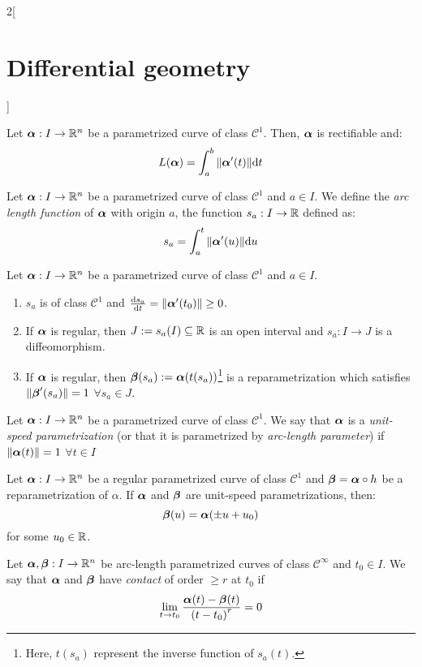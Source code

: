 \documentclass[../../../main.tex]{subfiles}
\begin{document}
\begin{multicols}{2}[\section{Differential geometry}]
\begin{definition}
  \end{definition}
  \begin{prop}
    Let $\boldsymbol{\mathrm{\alpha}}:I\rightarrow\mathbb{R}^n$ be a parametrized curve of class $\mathcal{C}^1$. Then, $\boldsymbol{\mathrm{\alpha}}$ is rectifiable and: $$L(\boldsymbol{\mathrm{\alpha}})=\int_a^b\|\boldsymbol{\mathrm{\alpha}}'(t)\|\dd t$$
  \end{prop}
  \begin{definition}
    Let $\boldsymbol{\mathrm{\alpha}}:I\rightarrow\mathbb{R}^n$ be a parametrized curve of class $\mathcal{C}^1$ and $a\in I$. We define the \emph{arc length function} of $\boldsymbol{\mathrm{\alpha}}$ with origin $a$, the function $s_a:I\rightarrow\mathbb{R}$ defined as: $$s_a=\int_a^t\|\boldsymbol{\mathrm{\alpha}}'(u)\|\dd u$$
  \end{definition}
  \begin{prop}
    Let $\boldsymbol{\mathrm{\alpha}}:I\rightarrow\mathbb{R}^n$ be a parametrized curve of class $\mathcal{C}^1$ and $a\in I$.
    \begin{enumerate}
      \item $s_a$ is of class $\mathcal{C}^1$ and $\dv{s_a}{t}(t_0)=\|\boldsymbol{\mathrm{\alpha}}'(t_0)\|\geq 0$.
      \item If $\boldsymbol{\mathrm{\alpha}}$ is regular, then $J:=s_a(I)\subseteq\mathbb{R}$ is an open interval and $s_a:I\rightarrow J$ is a diffeomorphism.
      \item If $\boldsymbol{\mathrm{\alpha}}$ is regular, then $\boldsymbol{\mathrm{\beta}}(s_a):=\boldsymbol{\mathrm{\alpha}}(t(s_a))$\footnote{Here, $t(s_a)$ represent the inverse function of $s_a(t)$.} is a reparametrization which satisfies $\|\boldsymbol{\mathrm{\beta}}'(s_a)\|=1$ $\forall s_a\in J$.
    \end{enumerate}
  \end{prop}
  \begin{definition}
    Let $\boldsymbol{\mathrm{\alpha}}:I\rightarrow\mathbb{R}^n$ be a parametrized curve of class $\mathcal{C}^1$. We say that $\boldsymbol{\mathrm{\alpha}}$ is a \emph{unit-speed parametrization} (or that it is parametrized by \emph{arc-length parameter}) if $\|\boldsymbol{\mathrm{\alpha}}(t)\|=1$ $\forall t\in I$
  \end{definition}
  \begin{prop}
    Let $\boldsymbol{\mathrm{\alpha}}:I\rightarrow\mathbb{R}^n$ be a regular parametrized curve of class $\mathcal{C}^1$ and $\boldsymbol{\mathrm{\beta}}=\boldsymbol{\mathrm{\alpha}}\circ h$ be a reparametrization of $\alpha$. If $\boldsymbol{\mathrm{\alpha}}$ and $\boldsymbol{\mathrm{\beta}}$ are unit-speed parametrizations, then: $$\boldsymbol{\mathrm{\beta}}(u)=\boldsymbol{\mathrm{\alpha}}(\pm u+u_0)$$ for some $u_0\in\mathbb{R}$.
  \end{prop}
  \begin{definition}
    Let $\boldsymbol{\mathrm{\alpha}},\boldsymbol{\mathrm{\beta}}:I\rightarrow\mathbb{R}^n$ be arc-length parametrized curves of class $\mathcal{C}^\infty$ and $t_0\in I$. We say that $\boldsymbol{\mathrm{\alpha}}$ and $\boldsymbol{\mathrm{\beta}}$ have \emph{contact} of order $\geq r$ at $t_0$ if $$\lim_{t\to t_0}\frac{\boldsymbol{\mathrm{\alpha}}(t)-\boldsymbol{\mathrm{\beta}}(t)}{{(t-t_0)}^r}=0$$

\end{definition}
\end{multicols}
\end{document}

